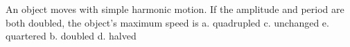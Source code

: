 \label{fnt8.4.2-4}

An object moves with simple harmonic motion.  If the amplitude and period are both doubled, the object's maximum speed is
a.	quadrupled		c. unchanged		e. quartered
b.	doubled		d. halved
